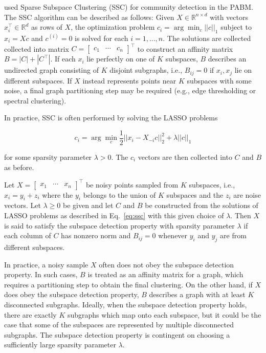\documentclass[12pt]{article}
\begin{document}
\citet*{noroozi2019estimation} used Sparse Subspace Clustering (SSC) 
\cite{5206547} for community detection in the PABM. 
The SSC algorithm can be described as follows: 
Given \(X \in \mathbb{R}^{n \times d}\) with vectors
\(x_i^\top \in \mathbb{R}^d\) as rows of \(X\), the optimization problem
\(c_i = \arg\min_{c} ||c||_1\) subject to \(x_i = X c\) and
\(c^{(i)} = 0\) is solved for each \(i = 1, ..., n\). The solutions are
collected collected into matrix
\(C = \begin{bmatrix} c_1 & \cdots & c_n \end{bmatrix}^\top\) to
construct an affinity matrix \(B = |C| + |C^\top|\). If each \(x_i\) lie
perfectly on one of \(K\) subspaces, \(B\) describes an undirected graph
consisting of \(K\) disjoint subgraphs, i.e., \(B_{ij} = 0\) if
\(x_i, x_j\) lie on different subspaces. If \(X\) instead represents
points near \(K\) subspaces with some noise, a final graph partitioning
step may be required (e.g., edge thresholding or spectral clustering).

In practice, SSC is often performed by solving the LASSO problems

\begin{equation} \label{eq:ssc}
c_i = \arg\min_c \frac{1}{2} ||x_i - X_{-i} c||^2_2 + \lambda ||c||_1
\end{equation}

for some sparsity parameter \(\lambda > 0\). The \(c_i\) vectors are
then collected into \(C\) and \(B\) as before.

\begin{definition}
  \label{def:subspace_detection}
Let $X = \begin{bmatrix} x_1 & \cdots & x_n \end{bmatrix}^\top$ be noisy
points sampled from $K$ subspaces, i.e., $x_i = y_i + z_i$ where the
$y_i$ belongs to the union of $K$ subspaces and the $z_i$ are noise
vectors. Let $\lambda \geq 0$ be given and
let $C$ and $B$ be constructed from the
solutions of LASSO problems as described in Eq.~\eqref{eq:ssc} with
this given choice of $\lambda$. Then $X$
is said to satisfy the subspace detection property 
with sparsity parameter $\lambda$ if each column of
$C$ has nonzero norm and $B_{ij} = 0$ whenever $y_i$ and $y_j$ are
from different subspaces.
\end{definition}

\begin{remark}
In practice, a noisy sample $X$ often does not obey the subspace detection
property. In such cases, $B$ is treated as an affinity matrix for a graph, 
which requires a partitioning step to obtain the final clustering. On the other
hand, if $X$ does obey the subspace detection property, $B$ describes a graph
with at least $K$ disconnected subgraphs. Ideally, when the subspace detection
property holds, there are exactly $K$ subgraphs which map onto each subspace,
but it could be the case that some of the subspaces are represented by
multiple disconnected subgraphs. The subspace detection property is contingent
on choosing a sufficiently large sparsity parameter $\lambda$.
\end{remark}
\end{document}
